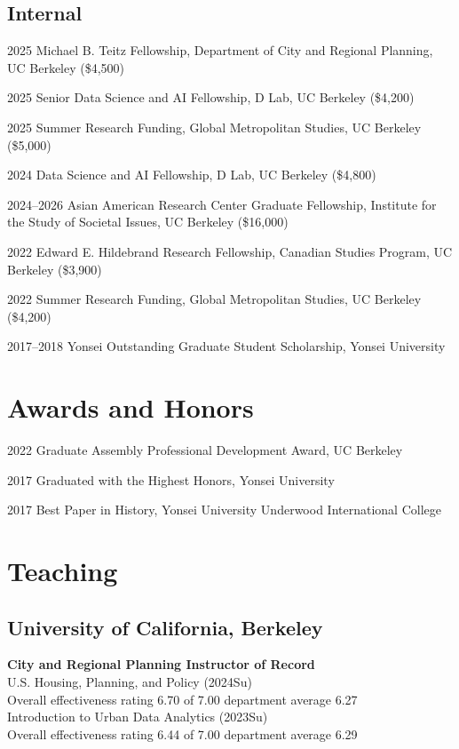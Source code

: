 \documentclass[11pt,letterpaper]{article}
\newcommand{\money}[1]{(\$#1)}  %
\newcommand{\term}[1]{(#1)}     %
\begin{document}
\subsection{Internal}
\begin{tablist}
  \item[2025] \tab{}Michael B. Teitz Fellowship, Department of City and Regional Planning, UC Berkeley \money{4,500}
  \item[2025] \tab{}Senior Data Science and AI Fellowship, D Lab, UC Berkeley \money{4,200}
  \item[2025] \tab{}Summer Research Funding, Global Metropolitan Studies, UC Berkeley \money{5,000}
  \item[2024] \tab{}Data Science and AI Fellowship, D Lab, UC Berkeley \money{4,800}
  \item[2024–2026] \tab{}Asian American Research Center Graduate Fellowship, Institute for the Study of Societal Issues, UC Berkeley \money{16,000}
  \item[2022] \tab{}Edward E. Hildebrand Research Fellowship, Canadian Studies Program, UC Berkeley \money{3,900}
  \item[2022] \tab{}Summer Research Funding, Global Metropolitan Studies, UC Berkeley \money{4,200}
  \item[2017–2018] \tab{}Yonsei Outstanding Graduate Student Scholarship, Yonsei University
\end{tablist}

\section{Awards and Honors}
\begin{tablist}
  \item[2022] \tab{}Graduate Assembly Professional Development Award, UC Berkeley
  \item[2017] \tab{}Graduated with the Highest Honors, Yonsei University
  \item[2017] \tab{}Best Paper in History, Yonsei University Underwood International College
\end{tablist}

\section{Teaching}

\subsection{University of California, Berkeley}
\textbf{City and Regional Planning  Instructor of Record}\\[0.2em]
U.S. Housing, Planning, and Policy \term{2024Su}\\
\quad Overall effectiveness rating 6.70 of 7.00 department average 6.27\\[0.2em]
Introduction to Urban Data Analytics \term{2023Su}\\
\quad Overall effectiveness rating 6.44 of 7.00 department average 6.29\\[0.5em]
\end{document}
